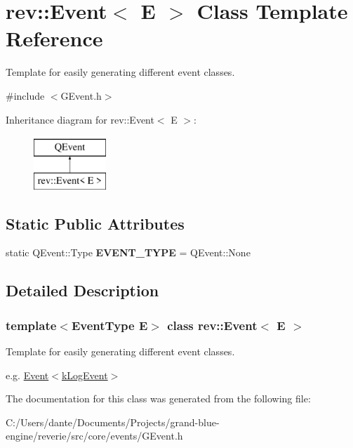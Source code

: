 \hypertarget{classrev_1_1_event}{}\section{rev\+::Event$<$ E $>$ Class Template Reference}
\label{classrev_1_1_event}


Template for easily generating different event classes.  




{\ttfamily \#include $<$G\+Event.\+h$>$}

Inheritance diagram for rev\+::Event$<$ E $>$\+:\begin{figure}[H]
\begin{center}
\leavevmode
\includegraphics[height=2.000000cm]{classrev_1_1_event}
\end{center}
\end{figure}
\subsection*{Static Public Attributes}
\begin{DoxyCompactItemize}
\item 
\mbox{\label{classrev_1_1_event_a78deced8f00b70d96b1f7a09a8081e22}} 
static Q\+Event\+::\+Type {\bfseries E\+V\+E\+N\+T\+\_\+\+T\+Y\+PE} = Q\+Event\+::\+None
\end{DoxyCompactItemize}


\subsection{Detailed Description}
\subsubsection*{template$<$Event\+Type E$>$\newline
class rev\+::\+Event$<$ E $>$}

Template for easily generating different event classes. 

e.\+g. \mbox{\hyperlink{classrev_1_1_event}{Event$<$k\+Log\+Event$>$}} 

The documentation for this class was generated from the following file\+:\begin{DoxyCompactItemize}
\item 
C\+:/\+Users/dante/\+Documents/\+Projects/grand-\/blue-\/engine/reverie/src/core/events/G\+Event.\+h\end{DoxyCompactItemize}
